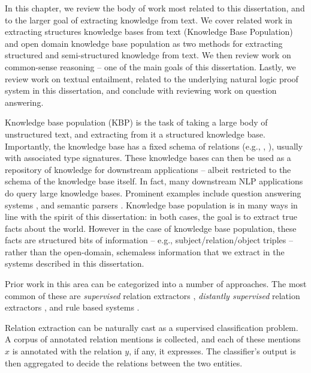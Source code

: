 In this chapter, we review the body of work most related to this dissertation, and to
  the larger goal of extracting knowledge from text.
We cover related work in extracting structures knowledge bases from text
  (Knowledge Base Population) and open domain knowledge base population
  as two methods for extracting structured and semi-structured knowledge from
  text.
We then review work on common-sense reasoning -- one of the main goals of this dissertation.
Lastly, we review work on textual entailment, related to the underlying natural logic
  proof system in this dissertation, and conclude with reviewing work on question answering.


%
%

Knowledge base population (KBP) is the task of taking a large body of unstructured text,
  and extracting from it a structured knowledge base.
Importantly, the knowledge base has a fixed schema of relations (e.g.,
  , ), usually with associated type signatures.
These knowledge bases can then be used as a repository of knowledge for
  downstream applications -- albeit restricted to the schema of the knowledge base itself.
In fact, many downstream NLP applications do query large knowledge bases.
Prominent examples include
  question answering systems
    \cite{key:2001voorhees-trec},
  and semantic parsers
    \cite{key:1996zelle-semantics,key:2007zettlemoyer-semantics,key:2013kwiatkowski-semantics,key:2014berant-semantics}.
Knowledge base population is in many ways in line with the spirit of this dissertation:
  in both cases, the goal is to extract true facts about the world.
However in the case of knowledge base population, these facts are structured bits of information -- e.g.,
  subject/relation/object triples -- rather than the open-domain, schemaless information that we 
  extract in the systems described in this dissertation.

Prior work in this area can be categorized into a number of approaches.
The most common of these are \textit{supervised} relation extractors
  \cite{key:2004doddington-ace,key:2005zhou-ace,key:2007surdeanu-ace},
  \textit{distantly supervised} relation extractors
  \cite{key:1999craven-distsup,key:2007wu-distsup,key:2009mintz-distsup,key:2011sun-kbp},
  and rule based systems
  \cite{key:1997soderland-kbp,key:2010grishman-kbp,key:2010chen-kbp}.


Relation extraction can be naturally cast as a supervised classification problem.
A corpus of annotated relation mentions is collected,
  and each of these mentions $x$ is annotated
  with the relation $y$, if any, it expresses. The classifier's output
  is then aggregated to decide the relations between the two entities.

